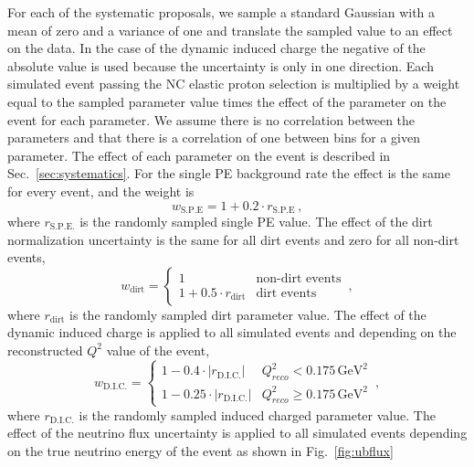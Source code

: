     For each of the systematic proposals, we sample a standard Gaussian with a
    mean of zero and a variance of one and translate the sampled value to an
    effect on the data. In the case of the dynamic induced charge the negative
    of the absolute value is used because the uncertainty is only in one
    direction. Each simulated event passing the NC elastic proton selection is
    multiplied by a weight equal to the sampled parameter value times the
    effect of the parameter on the event for each parameter. We assume there is
    no correlation between the parameters and that there is a correlation of
    one between bins for a given parameter. The effect of each parameter on the
    event is described in Sec.~\ref{sec:systematics}. For the single PE
    background rate the effect is the same for every event, and the weight is 
    \begin{equation}
      w_{\textrm{S.P.E}} = 1 + 0.2\cdot r_{\textrm{S.P.E}} \,,
    \end{equation}
    where $r_{\textrm{S.P.E.}}$ is the randomly sampled single PE value. The
    effect of the dirt normalization uncertainty is the same for all dirt
    events and zero for all non-dirt events,
    \begin{equation}
      w_{\textrm{dirt}} = 
      \begin{cases}
        1 &\textrm{non-dirt events} \\
        1 + 0.5\cdot r_{\textrm{dirt}}  &\textrm{dirt events}
      \end{cases} \,,
    \end{equation}
    where $r_{\textrm{dirt}}$ is the randomly sampled dirt parameter value. The
    effect of the dynamic induced charge is applied to all simulated events and depending
    on the reconstructed $Q^2$ value of the event,
    \begin{equation}
      w_{\textrm{D.I.C.}} = 
      \begin{cases}
        1 - 0.4\cdot |r_{\textrm{D.I.C.}}|  &Q^2_{reco} < 0.175 \,\textrm{GeV}^2 \\
        1 - 0.25\cdot |r_{\textrm{D.I.C.}}|  &Q^2_{reco} \ge 0.175 \,\textrm{GeV}^2
      \end{cases} \,,
    \end{equation}
    where $r_{\textrm{D.I.C.}}$ is the randomly sampled induced charged
    parameter value. The effect of the neutrino flux uncertainty is applied to
    all simulated events depending on the true neutrino energy of the event as
    shown in Fig.~\ref{fig:ubflux}
